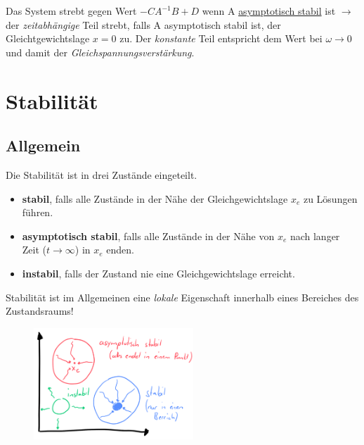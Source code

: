 \documentclass[
  10pt,
  a4paper,
  twocolumn]{article}
\providecommand{\tightlist}{%
  \setlength{\itemsep}{0pt}\setlength{\parskip}{0pt}}\usepackage{longtable,booktabs,array}
\numberwithin{equation}{section}
\begin{document}
Das System strebt gegen Wert \(-CA^{-1}B+D\) wenn A \ul{asymptotisch
stabil} ist \(\rightarrow\) der \emph{zeitabhängige} Teil strebt, falls
A asymptotisch stabil ist, der Gleichtgewichtslage \(x=0\) zu. Der
\emph{konstante} Teil entspricht dem Wert bei \(\omega\rightarrow 0\)
und damit der \emph{Gleichspannungsverstärkung}.

\hypertarget{stabilituxe4t}{%
\section{Stabilität}\label{stabilituxe4t}}

\hypertarget{allgemein}{%
\subsection{Allgemein}\label{allgemein}}

Die Stabilität ist in drei Zustände eingeteilt.

\begin{itemize}
\tightlist
\item
  \textbf{stabil}, falls alle Zustände in der Nähe der
  Gleichgewichtslage \(x_e\) zu Lösungen führen.
\item
  \textbf{asymptotisch stabil}, falls alle Zustände in der Nähe von
  \(x_e\) nach langer Zeit (\(t \rightarrow \infty\)) in \(x_e\) enden.
\item
  \textbf{instabil}, falls der Zustand nie eine Gleichgewichtslage
  erreicht.
\end{itemize}

Stabilität ist im Allgemeinen eine \emph{lokale} Eigenschaft innerhalb
eines Bereiches des Zustandsraums!

\begin{figure}[H]

{\centering \includegraphics[width=6cm,height=4.2cm]{images/paste-70.png}

}

\end{figure}
\end{document}
